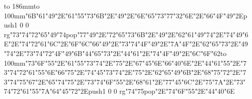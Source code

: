 \hbox to 186mm{\hsize=81mm\vbox to 100mm{\vfill\ipa\char"6B\ipa\char"61\ipa\char"49\ipa\char"2E\ipa\char"61\ipa\char"55\ipa\char"73\ipa\char"6B\ipa\char"2E\ipa\char"49\ipa\char"2E\ipa\char"6E\ipa\char"65\ipa\char"73\medskip\ipa\char"77\ipa\char"32\ipa\char"6E\ipa\char"2E\ipa\char"66\ipa\char"4F\ipa\char"49\ipa\char"2E\pdfcolorstack\match push{1 0 0 rg}\ipa\char"73\ipa\char"74\ipa\char"72\ipa\char"65\ipa\char"49\ipa\char"74\pdfcolorstack\match pop{}\medskip\ipa\char"77\ipa\char"49\ipa\char"2E\ipa\char"72\ipa\char"65\ipa\char"73\ipa\char"6B\ipa\char"2E\ipa\char"49\ipa\char"2E\ipa\char"62\ipa\char"61\ipa\char"49\ipa\char"74\ipa\char"2E\ipa\char"74\ipa\char"49\ipa\char"6E\ipa\char"2E\ipa\char"74\ipa\char"72\ipa\char"61\ipa\char"6C\ipa\char"2E\ipa\char"6F\ipa\char"6C\ipa\char"66\medskip\ipa\char"49\ipa\char"2E\ipa\char"73\ipa\char"74\ipa\char"4F\ipa\char"49\ipa\char"2E\ipa\char"7A\ipa\char"4F\ipa\char"2E\ipa\char"62\ipa\char"65\ipa\char"73\ipa\char"2E\ipa\char"49\ipa\char"74\ipa\char"2E\ipa\char"73\ipa\char"74\ipa\char"72\ipa\char"4F\ipa\char"49\ipa\char"6B\medskip\ipa\char"44\ipa\char"65\ipa\char"73\ipa\char"2E\ipa\char"44\ipa\char"61\ipa\char"2E\ipa\char"74\ipa\char"4F\ipa\char"49\ipa\char"2E\ipa\char"6C\ipa\char"6F\ipa\char"62\vfill}\hfill\vbox to 100mm{\vfill\ipa\char"73\ipa\char"6F\ipa\char"55\ipa\char"2E\ipa\char"61\ipa\char"55\ipa\char"73\ipa\char"74\ipa\char"2E\ipa\char"75\ipa\char"2E\ipa\char"67\ipa\char"45\ipa\char"6E\medskip\ipa\char"66\ipa\char"40\ipa\char"6E\ipa\char"2E\ipa\char"44\ipa\char"61\ipa\char"55\ipa\char"2E\ipa\char"73\ipa\char"74\ipa\char"72\ipa\char"61\ipa\char"55\ipa\char"6E\medskip\ipa\char"66\ipa\char"75\ipa\char"2E\ipa\char"74\ipa\char"45\ipa\char"73\ipa\char"74\ipa\char"2E\ipa\char"75\ipa\char"2E\ipa\char"62\ipa\char"65\ipa\char"49\ipa\char"6B\ipa\char"2E\ipa\char"68\ipa\char"75\ipa\char"72\ipa\char"2E\ipa\char"73\ipa\char"74\ipa\char"75\ipa\char"67\ipa\char"2E\ipa\char"65\ipa\char"74\medskip\ipa\char"75\ipa\char"2E\ipa\char"73\ipa\char"74\ipa\char"6F\ipa\char"55\ipa\char"2E\ipa\char"68\ipa\char"61\ipa\char"2E\ipa\char"77\ipa\char"45\ipa\char"6C\ipa\char"2E\ipa\char"75\ipa\char"7A\ipa\char"2E\ipa\char"73\ipa\char"74\ipa\char"72\ipa\char"61\ipa\char"55\ipa\char"7A\medskip\ipa\char"64\ipa\char"45\ipa\char"72\ipa\char"2E\pdfcolorstack\match push{1 0 0 rg}\ipa\char"74\ipa\char"75\pdfcolorstack\match pop{}\ipa\char"2E\ipa\char"74\ipa\char"6F\ipa\char"55\ipa\char"2E\ipa\char"44\ipa\char"40\ipa\char"6E\vfill}}\eject
